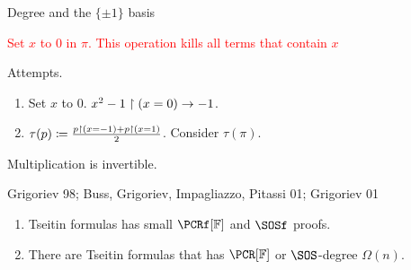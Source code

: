 \begin{frame}{Degree and the $\{\pm 1\}$ basis}
    \pause
    \begin{center}
            \textcolor{red}{Set $x$ to $0$ in $\pi$. This operation kills all terms that contain $x$}
    \end{center}

    \pause
    \vspace{0.5cm}

    Attempts.
    \begin{enumerate}
        \item Set $x$ to $0$. \pause \hspace{1cm} $x^2 - 1 \rest (x = 0) \to -1$.
        \pause
        \item $\tau(p) \coloneqq \frac{p \rest (x = -1) + p \rest (x = 1)}{2}$. Consider $\tau(\pi)$.
    \end{enumerate}

    \pause

    \begin{minipage}{0.3\linewidth}
        \begin{prooftree}
        \end{prooftree}
    \end{minipage}
    \pause
    \begin{minipage}{0.3\linewidth}
        \begin{prooftree}
        \end{prooftree}
    \end{minipage}
    \pause
    \begin{minipage}{0.3\linewidth}
        \begin{prooftree}
        \end{prooftree}
    \end{minipage}

    \pause

    Multiplication is invertible.

    \pause


    \begin{block}{Grigoriev 98; Buss, Grigoriev, Impagliazzo, Pitassi 01; Grigoriev 01}
        \begin{enumerate}
            \item Tseitin formulas has small $\PCRf[\field]$ and $\SOSf$ proofs.
            \item There are Tseitin formulas that has $\PCR[\field]$ or $\SOS$-degree $\Omega(n)$.
        \end{enumerate}
    \end{block}
\end{frame}


